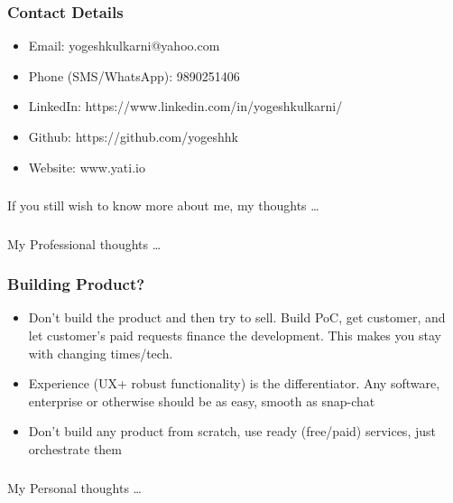 \begin{frame}[fragile]\frametitle{Contact Details}
\begin{itemize}
\item Email: yogeshkulkarni@yahoo.com
\item Phone (SMS/WhatsApp): 9890251406
\item LinkedIn: https://www.linkedin.com/in/yogeshkulkarni/
\item Github: https://github.com/yogeshhk
\item Website: www.yati.io
\end{itemize}
\end{frame}

\begin{frame}[fragile]\frametitle{}
\begin{center}
{\Large If you still wish to know more about me, my thoughts \ldots}
\end{center}
\end{frame}

\begin{frame}[fragile]\frametitle{}
\begin{center}
{\Large My Professional thoughts \ldots}
\end{center}
\end{frame}

\begin{frame}[fragile]\frametitle{Building Product?}
\begin{itemize}
\item Don't build the product and then try to sell. Build PoC, get customer, and let customer's paid requests finance the development. This makes you stay with changing times/tech.
\item Experience (UX+ robust functionality) is the differentiator. Any software, enterprise or otherwise should be as easy, smooth as snap-chat
\item Don't build any product from scratch, use ready (free/paid) services, just orchestrate them
\end{itemize}
\end{frame}

\begin{frame}[fragile]\frametitle{}
\begin{center}
{\Large My Personal thoughts \ldots}
\end{center}
\end{frame}

